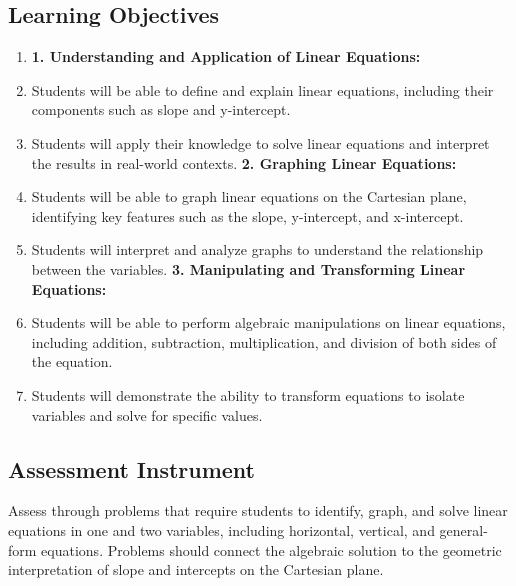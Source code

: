 \subsection{Learning Objectives}
\label{ssec:lear-fc06}

\begin{enumerate}
    \item \textbf{1. Understanding and Application of Linear Equations:}
    \item Students will be able to define and explain linear equations, including their components such as slope and y-intercept.
    \item Students will apply their knowledge to solve linear equations and interpret the results in real-world contexts. \textbf{2. Graphing Linear Equations:}
    \item Students will be able to graph linear equations on the Cartesian plane, identifying key features such as the slope, y-intercept, and x-intercept.
    \item Students will interpret and analyze graphs to understand the relationship between the variables. \textbf{3. Manipulating and Transforming Linear Equations:}
    \item Students will be able to perform algebraic manipulations on linear equations, including addition, subtraction, multiplication, and division of both sides of the equation.
    \item Students will demonstrate the ability to transform equations to isolate variables and solve for specific values.
\end{enumerate}

\subsection{Assessment Instrument}
\label{ssec:asse-9733}

Assess through problems that require students to identify, graph, and solve linear
equations in one and two variables, including horizontal, vertical, and general-form
equations. Problems should connect the algebraic solution to the geometric interpretation
of slope and intercepts on the Cartesian plane.

